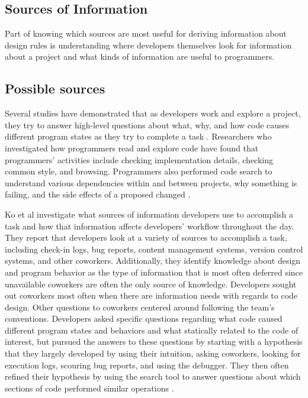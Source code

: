 \documentclass[12pt]{article}
\begin{document}
\subsection{Sources of Information} \label{infoSrcs}

Part of knowing which sources are most useful for deriving information about design rules is understanding where developers themselves look for information about a project and what kinds of information are useful to programmers.  

\subsection{Possible sources}

Several studies have demonstrated that as developers work and explore a project, they try to answer high-level questions about what, why, and how code causes different program states as they try to complete a task \cite{SadowskiEtAl2015, LaTozaMyers2010, LaTozaEtAl2007}. Researchers who investigated how programmers read and explore code have found that programmers' activities include checking implementation details, checking common style, and browsing. Programmers also performed code search to understand various dependencies within and between projects, why something is failing, and the side effects of a proposed changed \cite{SadowskiEtAl2015}. 

Ko et al investigate what sources of information developers use to accomplish a task and how that information affects developers' workflow throughout the day. They report that developers look at a variety of sources to accomplish a task, including check-in logs, bug reports, content management systems, version control systems, and other coworkers. Additionally, they identify knowledge about design and program behavior as the type of information that is most often deferred since unavailable coworkers are often the only source of knowledge. Developers sought out coworkers most often when there are information needs with regards to code design. Other questions to coworkers centered around following the team's conventions. Developers asked specific questions regarding what code caused different program states and behaviors and what statically related to the code of interest, but pursued the answers to these questions by starting with a hypothesis that they largely developed by using their intuition, asking coworkers, looking for execution logs, scouring bug reports, and using the debugger. They then often refined their hypothesis by using the search tool to answer questions about which sections of code performed similar operations \cite{KoEtAl2007}. 
\end{document}
